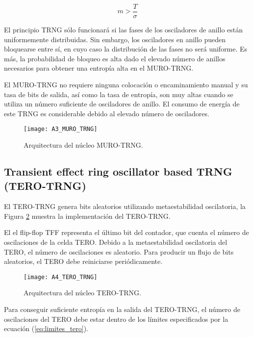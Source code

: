 			    \begin{equation}
			     m > \frac{T}{\sigma} 
			     \label{eq:muro_condicion}
			    \end{equation}	

            El principio TRNG sólo funcionará si las fases de los osciladores de anillo están uniformemente distribuidas. Sin embargo, los osciladores en anillo pueden bloquearse entre sí, en cuyo caso la distribución de las fases no será uniforme. Es más, la probabilidad de bloqueo es alta dado el elevado número de anillos necesarios para obtener una entropía alta en el MURO-TRNG.

            El MURO-TRNG no requiere ninguna colocación o encaminamiento manual y su tasa de bits de salida, así como la tasa de entropía, son muy altas cuando se utiliza un número suficiente de osciladores de anillo. El consumo de energía de este TRNG es considerable debido al elevado número de osciladores.
				
				\begin{figure}[hbtp]
					\caption{Arquitectura del núcleo MURO-TRNG.}
					\centering
					\texttt{[image: A3\_MURO\_TRNG]}
					\label{fig:A3_MURO_TRNG}
				\end{figure}


		\subsection{Transient effect ring oscillator based TRNG (TERO-TRNG)}

            El TERO-TRNG genera bits aleatorios utilizando metaestabilidad oscilatoria, la Figura \ref{fig:A4_TERO_TRNG} muestra la implementación del TERO-TRNG.

            El el flip-flop TFF representa el último bit del contador, que cuenta el número de oscilaciones de la celda TERO. Debido a la metaestabilidad oscilatoria del TERO, el número de oscilaciones es aleatorio. Para producir un flujo de bits aleatorios, el TERO debe reiniciarse periódicamente.
	
            \begin{figure}[hbtp]
                \caption{Arquitectura del núcleo TERO-TRNG.}
                \centering
                \texttt{[image: A4\_TERO\_TRNG]}
                \label{fig:A4_TERO_TRNG}
            \end{figure}

            Para conseguir suficiente entropía en la salida del TERO-TRNG, el número de oscilaciones del TERO debe estar dentro de los límites especificados por la ecuación (\ref{eq:limites_tero}).

